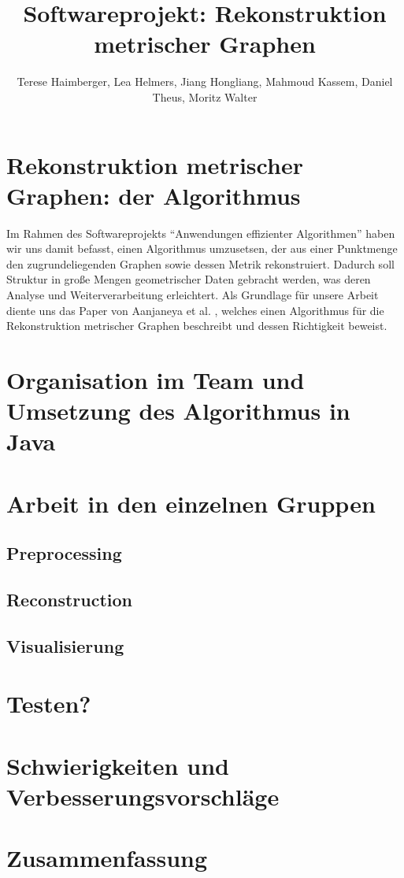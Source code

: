 \documentclass[parskip=half,
 fontsize=12pt, bibtotoc,
 ngerman]
 {article}
\author{Terese Haimberger, Lea Helmers, Jiang Hongliang, Mahmoud Kassem, Daniel Theus, Moritz Walter}
\title{Softwareprojekt: Rekonstruktion metrischer Graphen}
\date{}
\begin{document}
\maketitle
\onehalfspacing
\section{Rekonstruktion metrischer Graphen: der Algorithmus}
Im Rahmen des Softwareprojekts "`Anwendungen effizienter Algorithmen"' haben wir uns damit befasst, einen Algorithmus umzusetsen, der aus einer Punktmenge den zugrundeliegenden Graphen sowie dessen Metrik rekonstruiert. Dadurch soll Struktur in gro{\ss}e Mengen geometrischer Daten gebracht werden, was deren Analyse und Weiterverarbeitung erleichtert. Als Grundlage für unsere Arbeit diente uns das Paper von Aanjaneya et al. \cite{chenEa2012}, welches einen Algorithmus für die Rekonstruktion metrischer Graphen beschreibt und dessen Richtigkeit beweist.\newline
\section{Organisation im Team und Umsetzung des Algorithmus in Java}
\section{Arbeit in den einzelnen Gruppen}
\subsection{Preprocessing}
\subsection{Reconstruction}
\subsection{Visualisierung}

\section{Testen?}
\section{Schwierigkeiten und Verbesserungsvorschläge}
\section{Zusammenfassung}
\printbibliography
\end{document}
